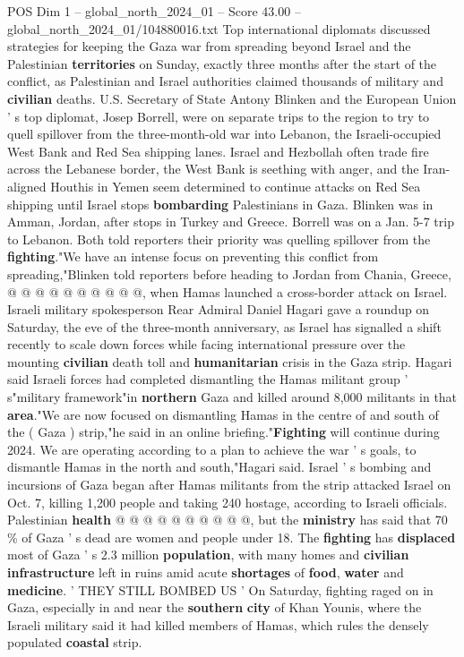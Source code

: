 \begin{textsample}{POS Dim 1 – global\_north\_2024\_01 – Score 43.00 – global\_north\_2024\_01/104880016.txt}  \label{ex:f1_pos_157}
Top international diplomats discussed strategies for keeping the Gaza war from spreading beyond Israel and the Palestinian \textbf{territories} on Sunday, exactly three months after the start of the conflict, as Palestinian and Israel authorities claimed thousands of military and \textbf{civilian} deaths.
U.S.
Secretary of State Antony Blinken and the European Union ' s top diplomat, Josep Borrell, were on separate trips to the region to try to quell spillover from the three-month-old war into Lebanon, the Israeli-occupied West Bank and Red Sea shipping lanes.
Israel and Hezbollah often trade fire across the Lebanese border, the West Bank is seething with anger, and the Iran-aligned Houthis in Yemen seem determined to continue attacks on Red Sea shipping until Israel stops \textbf{bombarding} Palestinians in Gaza.
Blinken was in Amman, Jordan, after stops in Turkey and Greece.
Borrell was on a Jan. 5-7 trip to Lebanon.
Both told reporters their priority was quelling spillover from the \textbf{fighting}."We have an intense focus on preventing this conflict from spreading,"Blinken told reporters before heading to Jordan from Chania, Greece, @ @ @ @ @ @ @ @ @ @, when Hamas launched a cross-border attack on Israel.
Israeli military spokesperson Rear Admiral Daniel Hagari gave a roundup on Saturday, the eve of the three-month anniversary, as Israel has signalled a shift recently to scale down forces while facing international pressure over the mounting \textbf{civilian} death toll and \textbf{humanitarian} crisis in the Gaza strip.
Hagari said Israeli forces had completed dismantling the Hamas militant group ' s"military framework"in \textbf{northern} Gaza and killed around 8,000 militants in that \textbf{area}."We are now focused on dismantling Hamas in the centre of and south of the ( Gaza ) strip,"he said in an online briefing."\textbf{Fighting} will continue during 2024.
We are operating according to a plan to achieve the war ' s goals, to dismantle Hamas in the north and south,"Hagari said.
Israel ' s bombing and incursions of Gaza began after Hamas militants from the strip attacked Israel on Oct. 7, killing 1,200 people and taking 240 hostage, according to Israeli officials.
Palestinian \textbf{health} @ @ @ @ @ @ @ @ @ @, but the \textbf{ministry} has said that 70 \% of Gaza ' s dead are women and people under 18.
The \textbf{fighting} has \textbf{displaced} most of Gaza ' s 2.3 million \textbf{population}, with many homes and \textbf{civilian} \textbf{infrastructure} left in ruins amid acute \textbf{shortages} of \textbf{food}, \textbf{water} and \textbf{medicine}. ' THEY STILL BOMBED US ' On Saturday, fighting raged on in Gaza, especially in and near the \textbf{southern} \textbf{city} of Khan Younis, where the Israeli military said it had killed members of Hamas, which rules the densely populated \textbf{coastal} strip.

\end{textsample}
